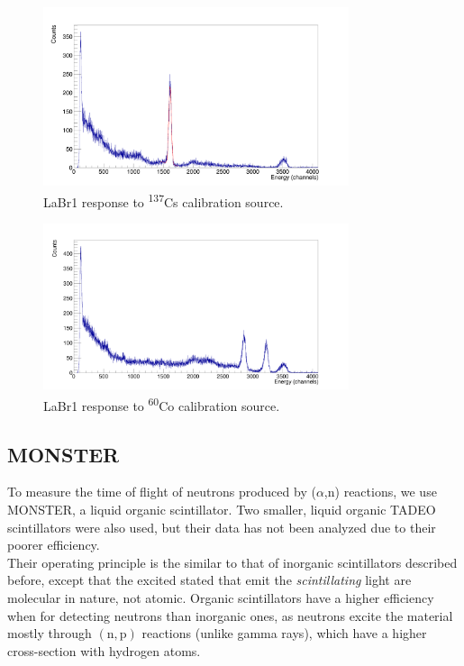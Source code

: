 \documentclass[a4paper,12pt]{report}
\newcommand{\an}{($\alpha$,n) }
\begin{document}
\begin{figure}[H]
	\centering
	\includegraphics[width=0.80\textwidth]{labr_cs137_calibration.png}
	\caption{LaBr1 response to \textsuperscript{137}Cs calibration source.}
	\label{labr_cs137_calibration}
\end{figure}

\begin{figure}[H]
	\centering
	\includegraphics[width=0.80\textwidth]{labr_co60_calibration.png}
	\caption{LaBr1 response to \textsuperscript{60}Co calibration source.}
	\label{labr_co60_calibration}
\end{figure}

\subsection{MONSTER}
To measure the time of flight of neutrons produced by \an reactions, we use MONSTER, a liquid organic scintillator.
Two smaller, liquid organic TADEO scintillators were also used, but their data has not been analyzed due to their poorer efficiency.
\\

Their operating principle is the similar to that of inorganic scintillators described before, except that the excited stated that emit the \textit{scintillating} light are molecular in nature, not atomic.
Organic scintillators have a higher efficiency when for detecting neutrons than inorganic ones, as neutrons excite the material mostly through $\left( \text{n},\text{p}  \right)$ reactions (unlike gamma rays), which have a higher cross-section with hydrogen atoms.
\end{document}
